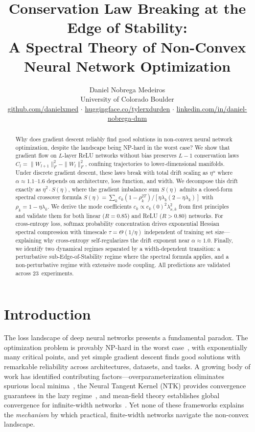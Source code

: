 \documentclass[11pt]{article}
\title{\textbf{Conservation Law Breaking at the Edge of Stability:\\A Spectral Theory of Non-Convex Neural Network Optimization}}
\author{
  Daniel Nobrega Medeiros \\
  University of Colorado Boulder \\[4pt]
  \small \href{https://github.com/danielxmed}{github.com/danielxmed} $\cdot$
  \href{https://huggingface.co/tylerxdurden}{huggingface.co/tylerxdurden} $\cdot$
  \href{https://linkedin.com/in/daniel-nobrega-dnm}{linkedin.com/in/daniel-nobrega-dnm}
}
\date{}
\newcommand{\lr}{\eta}                    %
\newcommand{\drexp}{\alpha}               %
\newcommand{\conslaw}{C_l}                %
\newcommand{\imbal}{S}                    %
\newcommand{\nsteps}{T}                   %
\newcommand{\spectau}{\tau}               %
\newcommand{\frobnorm}[1]{\|#1\|_F}      %
\theoremstyle{definition}
\theoremstyle{remark}
\begin{document}
\maketitle

\begin{abstract}
Why does gradient descent reliably find good solutions in non-convex neural network optimization, despite the landscape being NP-hard in the worst case?
We show that gradient flow on $L$-layer ReLU networks without bias preserves $L{-}1$ conservation laws $\conslaw = \frobnorm{W_{l+1}}^2 - \frobnorm{W_l}^2$, confining trajectories to lower-dimensional manifolds.
Under discrete gradient descent, these laws break with total drift scaling as $\lr^\drexp$ where $\drexp \approx 1.1$--$1.6$ depends on architecture, loss function, and width.
We decompose this drift exactly as $\lr^2 \cdot \imbal(\lr)$, where the gradient imbalance sum $\imbal(\lr)$ admits a closed-form spectral crossover formula $\imbal(\lr) = \sum_k c_k (1 - \rho_k^{2\nsteps}) / [\lr \lambda_k (2 - \lr\lambda_k)]$ with $\rho_k = 1 - \lr\lambda_k$.
We derive the mode coefficients $c_k \propto e_k(0)^2 \lambda_{x,k}^2$ from first principles and validate them for both linear ($R = 0.85$) and ReLU ($R > 0.80$) networks.
For cross-entropy loss, softmax probability concentration drives exponential Hessian spectral compression with timescale $\spectau = \Theta(1/\lr)$ independent of training set size---explaining why cross-entropy self-regularizes the drift exponent near $\drexp \approx 1.0$.
Finally, we identify two dynamical regimes separated by a width-dependent transition: a perturbative sub-Edge-of-Stability regime where the spectral formula applies, and a non-perturbative regime with extensive mode coupling.
All predictions are validated across 23~experiments.
\end{abstract}

\section{Introduction}
\label{sec:intro}

The loss landscape of deep neural networks presents a fundamental paradox. The optimization problem is provably NP-hard in the worst case~\citep{choromanska2015loss}, with exponentially many critical points, and yet simple gradient descent finds good solutions with remarkable reliability across architectures, datasets, and tasks. A growing body of work has identified contributing factors---overparameterization eliminates spurious local minima~\citep{du2019gradient,allenzhu2019convergence}, the Neural Tangent Kernel (NTK) provides convergence guarantees in the lazy regime~\citep{jacot2018neural}, and mean-field theory establishes global convergence for infinite-width networks~\citep{mei2018mean,chizat2018global}. Yet none of these frameworks explains the \emph{mechanism} by which practical, finite-width networks navigate the non-convex landscape.
\end{document}
